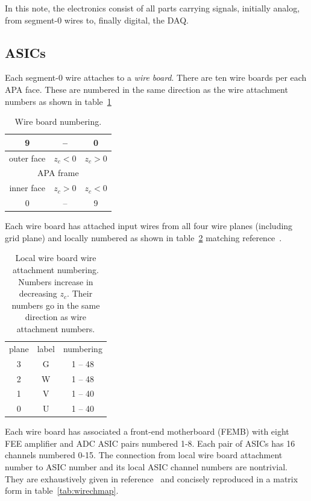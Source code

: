 \documentclass[pdftex,12pt,letter]{article}
\begin{document}
In this note, the electronics consist of all parts carrying signals,
initially analog, from segment-0 wires to, finally digital, the DAQ.

\subsection{ASICs}

Each segment-0 wire attaches to a \textit{wire board}.  There are
ten wire boards per each APA face.  These are numbered in the same
direction as the wire attachment numbers as shown in table~\ref{tab:wireboards}

\begin{table}[htp]
  \label{tab:wireboards}
  \centering
  \begin{tabular}[h]{ccc}
    \hline
     9 & -- & 0 \\
    \hline
    outer face & $z_c<0$  & $z_c>0$\\
    \hline
    \multicolumn{3}{|c|}{APA frame}\\
    \hline
    inner face & $z_c>0$ & $z_c<0$\\
    \hline
    0 & -- & 9 \\
    \hline
  \end{tabular}
  \caption{Wire board numbering.}
\end{table}

Each wire board has attached input wires from all four wire planes
(including grid plane) and locally numbered as shown in
table~\ref{tab:wireboard} matching reference~\cite{docdb2060-v3-adaptor-board-0}.

\begin{table}[htp]
  \label{tab:wireboard}
  \centering
  \begin{tabular}[h]{ccc}
    plane & label & numbering \\
    3 & G & 1 -- 48 \\
    2 & W & 1 -- 48 \\
    1 & V & 1 -- 40 \\
    0 & U & 1 -- 40 \\
  \end{tabular}
  \caption{Local wire board wire attachment numbering.  Numbers
    increase in decreasing $z_c$.  Their numbers go in the same direction as
    wire attachment numbers.}
\end{table}

\noindent Each wire board has associated a front-end motherboard
(FEMB) with eight FEE amplifier and ADC ASIC pairs numbered 1-8.  Each
pair of ASICs has 16 channels numbered 0-15.  The connection from local
wire board attachment number to ASIC number and its local ASIC channel
numbers are nontrivial.  They are exhaustively given in
reference~\cite{wirechmap} and concisely reproduced in a matrix form
in table~\ref{tab:wirechmap}.
\end{document}

